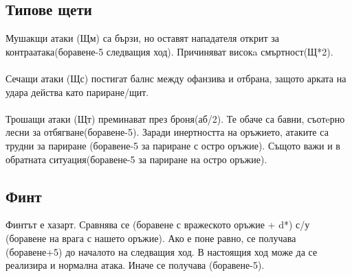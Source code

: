 \begin{footnotesize}
\begin{multicols}{2}
\subsection{Типове щети}
Мушакщи атаки (Щм) са бързи, но оставят нападателя открит за контраатака(боравене-5 следващия ход).
Причиняват високa смъртност(Щ*2).
\\
\\
Сечащи атаки (Щс) постигат балнс между офанзива и отбрана, защото арката на удара действа като париране/щит.
\\
\\
Трошащи атаки (Щт) преминават през броня(аб/2).
Те обаче са бавни, съотeрно лесни за отбягване(боравене-5).
Заради инертността на оръжието, атаките са трудни за париране (боравене-5 за париране с остро оръжие).
Същото важи и в обратната ситуация(боравене-5 за париране на остро оръжие).


\subsection{Финт}
Финтът е хазарт.
Сравнява се (боравене с вражеското оръжие + d*) с/у (боравене на врага с нашето оръжие).
Ако е поне равно, се получава (боравене+5) до началото на следващия ход.
В настоящия ход може да се реализира и нормална атака.
Иначе се получава (боравене-5).



\end{multicols}
\end{footnotesize}
